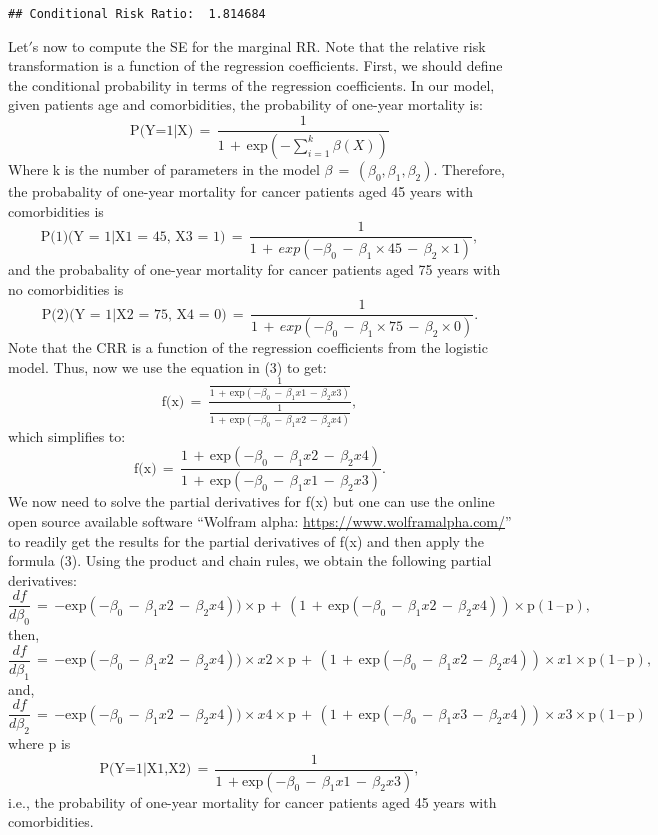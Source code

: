 \documentclass[
]{article}
\begin{document}
\begin{verbatim}
## Conditional Risk Ratio:  1.814684
\end{verbatim}

Let\('\)s now to compute the SE for the marginal RR. Note that the
relative risk transformation is a function of the regression
coefficients. First, we should define the conditional probability in
terms of the regression coefficients. In our model, given patients age
and comorbidities, the probability of one-year mortality is:
\[\text{P(Y=1|X)}\,=\,\frac{1}{1\,+\,\text{exp}(−\sum_{i=1}^k \beta(X))}\]
Where k is the number of parameters in the model
\(\beta\,=\,(\beta_{0},\beta_{1},\beta_{2})\). Therefore, the
probabality of one-year mortality for cancer patients aged 45 years with
comorbidities is
\[\text{P(1)(Y = 1|X1 = 45, X3 = 1)}\,=\,\frac{1}{1\,+\,exp(−\beta_{0}\,-\,\beta_{1}\times 45\,-\,\beta_{2}\times 1)},\]
and the probabality of one-year mortality for cancer patients aged 75
years with no comorbidities is
\[\text{P(2)(Y = 1|X2 = 75, X4 = 0)}\,=\,\frac{1}{1\,+\,exp(−\beta_{0}\,-\,\beta_{1}\times 75\,-\,\beta_{2}\times 0)}.\]
Note that the CRR is a function of the regression coefficients from the
logistic model. Thus, now we use the equation in (3) to get:
\[\text{f(x)}\,=\,\frac{\frac{1}{1\,+\,\text{exp}(−\beta_{0}\,-\,\beta_{1}x1\,-\,\beta_{2} x3)}}{\frac{1}{1\,+\,\text{exp}(−\beta_{0}\,-\,\beta_{1}x2\,-\,\beta_{2}x4)}},\]
which simplifies to:
\[\text{f(x)}\,=\,\frac{1\,+\,\text{exp}(−\beta_{0}\,-\,\beta_{1}x2\,-\,\beta_{2} x4)}{1\,+\,\text{exp}(−\beta_{0}\,-\,\beta_{1}x1\,-\,\beta_{2}x3)}.\]
We now need to solve the partial derivatives for f(x) but one can use
the online open source available software ``Wolfram alpha:
\url{https://www.wolframalpha.com/}'' to readily get the results for the
partial derivatives of f(x) and then apply the formula (3). Using the
product and chain rules, we obtain the following partial derivatives:
\[\frac{df}{d\beta_{0}}\,=\,\text{−exp}(−\beta_{0}\,-\,\beta_{1}x2\,-\,\beta_{2} x4))\times \text{p}\,+\,(1\,+\,\text{exp}(−\beta_{0}\,-\,\beta_{1}x2\,-\,\beta_{2} x4))\times \text{p}(1\,–\,\text{p}),\]
then,
\[\frac{df}{d\beta_{1}}\,=\,\text{−exp}(−\beta_{0}\,-\,\beta_{1}x2\,-\,\beta_{2} x4))\times x2 \times \text{p}\,+\,(1\,+\,\text{exp}(−\beta_{0}\,-\,\beta_{1}x2\,-\,\beta_{2} x4))\times x1 \times \text{p}(1\,–\,\text{p}),\]
and,
\[\frac{df}{d\beta_{2}}\,=\,\text{−exp}(−\beta_{0}\,-\,\beta_{1}x2\,-\,\beta_{2} x4))\times x4 \times \text{p}\,+\,(1\,+\,\text{exp}(−\beta_{0}\,-\,\beta_{1}x3\,-\,\beta_{2} x4))\times x3 \times \text{p}(1\,–\,\text{p})\]
where p is
\[\text{P(Y=1|X1,X2)}\,=\,\frac{1}{1\,+\text{exp}(−\beta_{0}\,-\,\beta_{1}x1\,-\,\beta_{2}x3)},\]
i.e., the probability of one-year mortality for cancer patients aged 45
years with comorbidities.
\end{document}
